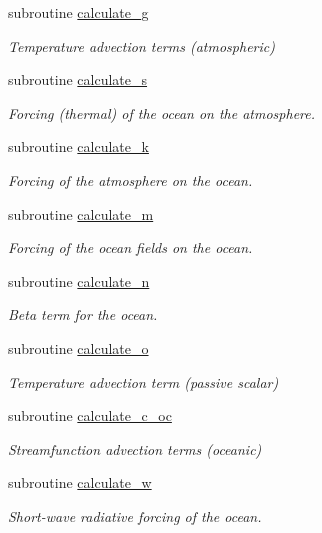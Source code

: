 \begin{DoxyCompactItemize}
subroutine \hyperlink{classinprod__analytic_a60bd361584d695120fff51940e523f0e}{calculate\-\_\-g}
\begin{DoxyCompactList}\small\item\em Temperature advection terms (atmospheric) \end{DoxyCompactList}\item 
subroutine \hyperlink{classinprod__analytic_af2f7504623cdd4e4e6b4b977126475ea}{calculate\-\_\-s}
\begin{DoxyCompactList}\small\item\em Forcing (thermal) of the ocean on the atmosphere. \end{DoxyCompactList}\item 
subroutine \hyperlink{classinprod__analytic_acb883b9fbefbca46b83b384ee74ed703}{calculate\-\_\-k}
\begin{DoxyCompactList}\small\item\em Forcing of the atmosphere on the ocean. \end{DoxyCompactList}\item 
subroutine \hyperlink{classinprod__analytic_ad89fa4b40a4f55e72942f09427d2bafd}{calculate\-\_\-m}
\begin{DoxyCompactList}\small\item\em Forcing of the ocean fields on the ocean. \end{DoxyCompactList}\item 
subroutine \hyperlink{classinprod__analytic_a76eeb8a6a44af38e397edd7e0617afca}{calculate\-\_\-n}
\begin{DoxyCompactList}\small\item\em Beta term for the ocean. \end{DoxyCompactList}\item 
subroutine \hyperlink{classinprod__analytic_a8b820fd46bfdc62c6ae712d4cbfd072f}{calculate\-\_\-o}
\begin{DoxyCompactList}\small\item\em Temperature advection term (passive scalar) \end{DoxyCompactList}\item 
subroutine \hyperlink{classinprod__analytic_aa45dedb07b415eb4cbdb908268c00aa9}{calculate\-\_\-c\-\_\-oc}
\begin{DoxyCompactList}\small\item\em Streamfunction advection terms (oceanic) \end{DoxyCompactList}\item 
subroutine \hyperlink{classinprod__analytic_ad275ee27fa04491805aa7a648183a754}{calculate\-\_\-w}
\begin{DoxyCompactList}\small\item\em Short-\/wave radiative forcing of the ocean. \end{DoxyCompactList}\end{DoxyCompactItemize}



